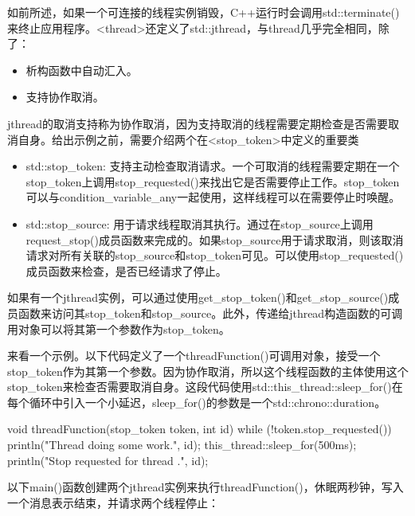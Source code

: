 
如前所述，如果一个可连接的线程实例销毁，C++运行时会调用std::terminate()来终止应用程序。<thread>还定义了std::jthread，与thread几乎完全相同，除了：

\begin{itemize}
\item
析构函数中自动汇入。

\item
支持协作取消。
\end{itemize}


jthread的取消支持称为协作取消，因为支持取消的线程需要定期检查是否需要取消自身。给出示例之前，需要介绍两个在<stop\_token>中定义的重要类

\begin{itemize}
\item
std::stop\_token: 支持主动检查取消请求。一个可取消的线程需要定期在一个stop\_token上调用stop\_requested()来找出它是否需要停止工作。stop\_token可以与condition\_variable\_any一起使用，这样线程可以在需要停止时唤醒。

\item
std::stop\_source: 用于请求线程取消其执行。通过在stop\_source上调用request\_stop()成员函数来完成的。如果stop\_source用于请求取消，则该取消请求对所有关联的stop\_source和stop\_token可见。可以使用stop\_requested()成员函数来检查，是否已经请求了停止。
\end{itemize}

如果有一个jthread实例，可以通过使用get\_stop\_token()和get\_stop\_source()成员函数来访问其stop\_token和stop\_source。此外，传递给jthread构造函数的可调用对象可以将其第一个参数作为stop\_token。

来看一个示例。以下代码定义了一个threadFunction()可调用对象，接受一个stop\_token作为其第一个参数。因为协作取消，所以这个线程函数的主体使用这个stop\_token来检查否需要取消自身。这段代码使用std::this\_thread::sleep\_for()在每个循环中引入一个小延迟，sleep\_for()的参数是一个std::chrono::duration。

\begin{cpp}
void threadFunction(stop_token token, int id)
{
    while (!token.stop_requested()) {
        println("Thread {} doing some work.", id);
        this_thread::sleep_for(500ms);
    }
    println("Stop requested for thread {}.", id);
}
\end{cpp}

以下main()函数创建两个jthread实例来执行threadFunction()，休眠两秒钟，写入一个消息表示结束，并请求两个线程停止：

